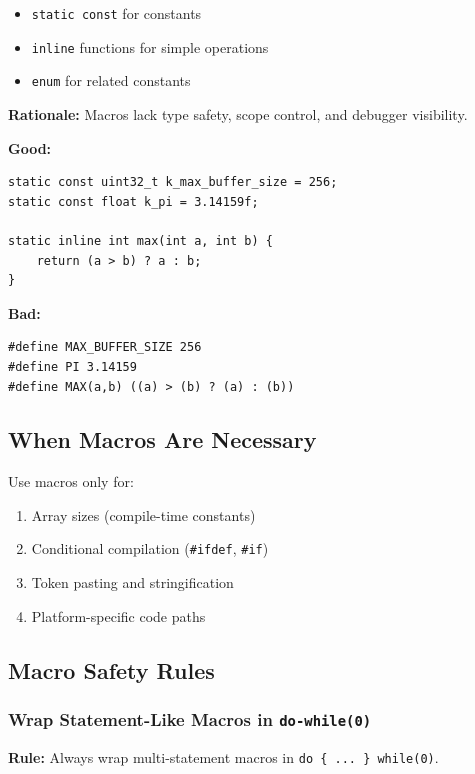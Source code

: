 \begin{itemize}
    \item \texttt{static const} for constants
    \item \texttt{inline} functions for simple operations
    \item \texttt{enum} for related constants
\end{itemize}

\textbf{Rationale:} Macros lack type safety, scope control, and debugger visibility.

\textbf{Good:}
\begin{verbatim}
static const uint32_t k_max_buffer_size = 256;
static const float k_pi = 3.14159f;

static inline int max(int a, int b) {
    return (a > b) ? a : b;
}
\end{verbatim}

\textbf{Bad:}
\begin{verbatim}
#define MAX_BUFFER_SIZE 256
#define PI 3.14159
#define MAX(a,b) ((a) > (b) ? (a) : (b))
\end{verbatim}

\subsection{When Macros Are Necessary}

Use macros only for:

\begin{enumerate}
    \item Array sizes (compile-time constants)
    \item Conditional compilation (\texttt{\#ifdef}, \texttt{\#if})
    \item Token pasting and stringification
    \item Platform-specific code paths
\end{enumerate}

\subsection{Macro Safety Rules}

\subsubsection{Wrap Statement-Like Macros in \texttt{do-while(0)}}

\textbf{Rule:} Always wrap multi-statement macros in \texttt{do \{ ... \} while(0)}.

